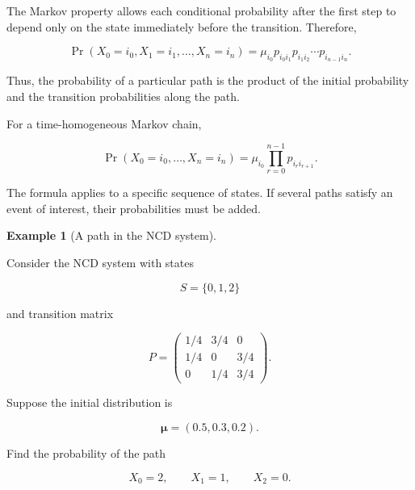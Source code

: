 \documentclass[
  letterpaper,
  DIV=11,
  numbers=noendperiod]{scrartcl}
\theoremstyle{definition}
\newtheorem{example}{Example}[section]
\theoremstyle{remark}
\begin{document}
The Markov property allows each conditional probability after the first
step to depend only on the state immediately before the transition.
Therefore,

\[
\boxed{
\Pr(X_0=i_0,X_1=i_1,\ldots,X_n=i_n)
=
\mu_{i_0}
p_{i_0i_1}
p_{i_1i_2}
\cdots
p_{i_{n-1}i_n}.
}
\]

Thus, the probability of a particular path is the product of the initial
probability and the transition probabilities along the path.

\begin{tcolorbox}[enhanced jigsaw, arc=.35mm, bottomrule=.15mm, bottomtitle=1mm, breakable, colback=white, colbacktitle=quarto-callout-note-color!10!white, colframe=quarto-callout-note-color-frame, coltitle=black, left=2mm, leftrule=.75mm, opacityback=0, opacitybacktitle=0.6, rightrule=.15mm, title=\textcolor{quarto-callout-note-color}{\faInfo}\hspace{0.5em}{Probability of a path}, titlerule=0mm, toprule=.15mm, toptitle=1mm]

For a time-homogeneous Markov chain,

\[
\boxed{
\Pr(X_0=i_0,\ldots,X_n=i_n)
=
\mu_{i_0}
\prod_{r=0}^{n-1}p_{i_ri_{r+1}}.
}
\]

The formula applies to a specific sequence of states. If several paths
satisfy an event of interest, their probabilities must be added.

\end{tcolorbox}

\begin{example}[A path in the NCD
system]\protect\hypertarget{exm-3}{}\label{exm-3}

Consider the NCD system with states

\[
S=\{0,1,2\}
\]

and transition matrix

\[
P=
\begin{pmatrix}
1/4 & 3/4 & 0\\
1/4 & 0 & 3/4\\
0 & 1/4 & 3/4
\end{pmatrix}.
\]

Suppose the initial distribution is

\[
\boldsymbol{\mu}=(0.5,0.3,0.2).
\]

Find the probability of the path

\[
X_0=2,\qquad X_1=1,\qquad X_2=0.
\]

\end{example}
\end{document}
